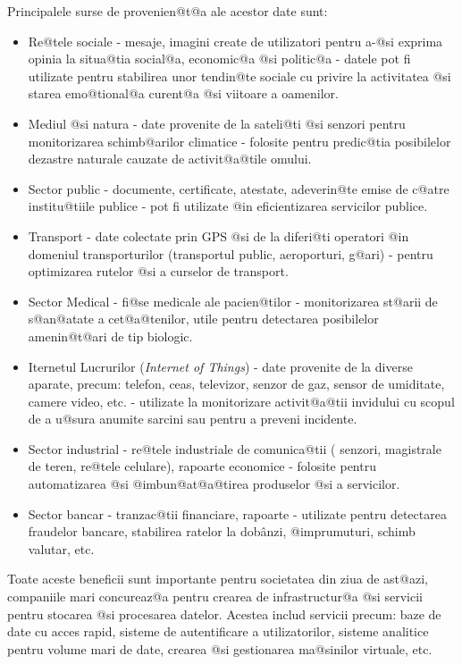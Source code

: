 Principalele surse de provenien@t@a ale acestor date sunt:
\begin{itemize}
	\item Re@tele sociale - mesaje, imagini create de utilizatori pentru a-@si exprima opinia la situa@tia social@a, economic@a @si politic@a - datele pot fi utilizate pentru stabilirea unor tendin@te sociale cu privire la activitatea @si starea emo@tional@a curent@a @si viitoare a oamenilor.
	\item Mediul @si natura - date provenite de la sateli@ti @si senzori pentru monitorizarea schimb@arilor climatice - folosite pentru predic@tia posibilelor dezastre naturale cauzate de activit@a@tile omului.
	\item Sector public - documente, certificate, atestate, adeverin@te emise de c@atre institu@tiile publice - pot fi utilizate @in eficientizarea servicilor publice.
	\item Transport - date colectate prin GPS @si de la diferi@ti operatori @in domeniul tran\-spor\-tu\-ri\-lor (transportul public, aeroporturi, g@ari) - pentru optimizarea rutelor @si a curselor de transport.
	\item Sector Medical - fi@se medicale ale pacien@tilor - monitorizarea st@arii de s@an@atate a cet@a@tenilor, utile pentru detectarea posibilelor amenin@t@ari de tip biologic.
	\item Iternetul Lucrurilor ({\sl Internet of Things}) - date provenite de la diverse aparate, precum: telefon, ceas, televizor, senzor de gaz, sensor de umiditate, camere video, etc. - utilizate la monitorizare activit@a@tii invidului cu scopul de a u@sura anumite sarcini sau pentru a preveni incidente.
	\item Sector industrial - re@tele industriale de comunica@tii ( senzori, magistrale de teren, re@tele celulare), rapoarte economice - folosite pentru automatizarea @si @imbun@at@a@tirea produselor @si a servicilor. 
	\item Sector bancar - tranzac@tii financiare, rapoarte - utilizate pentru detectarea fraudelor bancare, stabilirea ratelor la dob\^ anzi, @imprumuturi, schimb valutar, etc.
\end{itemize}

Toate aceste beneficii sunt importante pentru societatea din ziua de ast@azi, companiile mari concureaz@a pentru crearea de infrastructur@a @si servicii pentru stocarea @si procesarea datelor. Acestea includ servicii precum: baze de date cu acces rapid, sisteme de autentificare a utilizatorilor, sisteme analitice pentru volume mari de date, crearea @si gestionarea ma@sinilor virtuale, etc.


